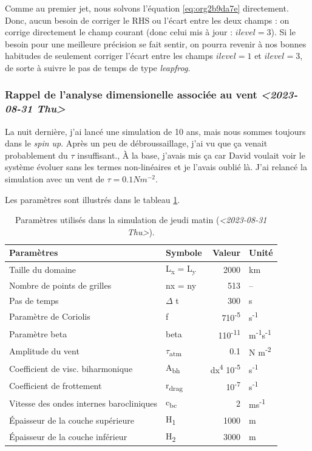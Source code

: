 \documentclass[10pt]{article}
\numberwithin{equation}{section}
\begin{document}
Comme au premier jet, nous solvons l'équation \ref{eq:org2b9da7e} directement.
Donc, aucun besoin de corriger le RHS ou l'écart entre les deux champs : on corrige directement le champ courant (donc celui mis à jour : \(ilevel=3\)).
Si le besoin pour une meilleure précision se fait sentir, on pourra revenir à nos bonnes habitudes de seulement corriger l'écart entre les champs \(ilevel=1\) et \(ilevel=3\), de sorte à suivre le pas de temps de type \emph{leapfrog}.

\subsubsection{Rappel de l'analyse dimensionelle associée au vent \textit{<2023-08-31 Thu>}}
\label{sec:org617adec}
La nuit dernière, j'ai lancé une simulation de 10 ans, mais nous sommes toujours dans le \emph{spin up}.
Après un peu de débroussaillage, j'ai vu que ça venait probablement du \(\tau\) insuffisant.,
À la base, j'avais mis ça car David voulait voir le système évoluer sans les termes non-linéaires et je l'avais oublié là.
J'ai relancé la simulation avec un vent de \(\tau = 0.1 Nm^{-2}\).\bigskip

Les paramètres sont illustrés dans le tableau \ref{tab:org3ec96fd}.

\begin{table}[htbp]
\caption{\label{tab:org3ec96fd}Paramètres utilisés dans la simulation de jeudi matin (\textit{<2023-08-31 Thu>}).}
\centering
\begin{tabular}{llrl}
\hline
\hline
Paramètres & Symbole & Valeur & Unité\\[0pt]
\hline
Taille du domaine & L\textsubscript{x} = L\textsubscript{y} & 2000 & km\\[0pt]
Nombre de points de grilles & nx = ny & 513 & --\\[0pt]
Pas de temps & \(\Delta\) t & 300 & s\\[0pt]
Paramètre de Coriolis & f & 7\texttimes{}10\textsuperscript{-5} & s\textsuperscript{-1}\\[0pt]
Paramètre beta & beta & 1\texttimes{}10\textsuperscript{-11} & m\textsuperscript{-1}s\textsuperscript{-1}\\[0pt]
Amplitude du vent & \(\tau\)\textsubscript{atm} & 0.1 & N m\textsuperscript{-2}\\[0pt]
Coefficient de visc. biharmonique & A\textsubscript{bh} & dx\textsuperscript{4} \texttimes{}10\textsuperscript{-5} & s\textsuperscript{-1}\\[0pt]
Coefficient de frottement & r\textsubscript{drag} & 10\textsuperscript{-7} & s\textsuperscript{-1}\\[0pt]
Vitesse des ondes internes barocliniques & c\textsubscript{bc} & 2 & ms\textsuperscript{-1}\\[0pt]
Épaisseur de la couche supérieure & H\textsubscript{1} & 1000 & m\\[0pt]
Épaisseur de la couche inférieur & H\textsubscript{2} & 3000 & m\\[0pt]
\hline
\end{tabular}
\end{table}
\end{document}
